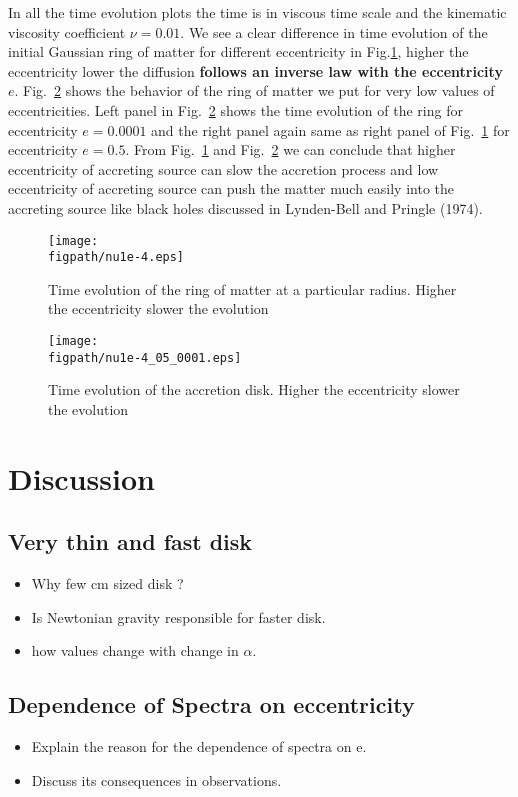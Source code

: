 \documentclass[useAMS,usenatbib]{mn2e}
\newcommand{\figpath}{./Figs/}
\begin{document}
In all the time evolution plots the time is in viscous time scale and the kinematic viscosity coefficient $\nu = 0.01$. We see a clear difference in time evolution of the initial Gaussian ring of matter for different eccentricity in Fig.\ref{evolve}, higher the eccentricity lower the diffusion \textbf{follows an inverse law with the eccentricity $e$}. Fig.~\ref{evolve1e-4} shows the behavior of the ring of matter we put for very low values of eccentricities. Left panel in Fig.~\ref{evolve1e-4} shows the time evolution of the ring for eccentricity $e = 0.0001$ and the right panel again same as right panel of Fig.~\ref{evolve} for eccentricity $e = 0.5$. From Fig.~\ref{evolve} and Fig.~\ref{evolve1e-4} we can conclude that higher eccentricity of accreting source can slow the accretion process and low eccentricity of accreting source can push the matter much easily into the accreting source like black holes discussed in Lynden-Bell and Pringle (1974).  
\begin{figure}
\centering
\texttt{[image: \\figpath/nu1e-4.eps]}
\caption{Time evolution of the ring of matter at a particular radius. Higher the eccentricity slower the evolution}
\label{evolve}
\end{figure}
\begin{figure}
\centering
\texttt{[image: \\figpath/nu1e-4\_05\_0001.eps]}
\caption{Time evolution of the accretion disk. Higher the eccentricity slower the evolution}
\label{evolve1e-4}
\end{figure}
\section{Discussion}
\subsection{Very thin and fast disk}
\begin{itemize}
\item Why few cm sized disk ?
\item Is Newtonian gravity responsible for faster disk. 
\item how values change with change in $\alpha$. 
\end{itemize}
\subsection{Dependence of Spectra on eccentricity}
\begin{itemize}
\item Explain the reason for the dependence of spectra on e. 
\item Discuss its consequences in observations.
\end{itemize}
\end{document}
